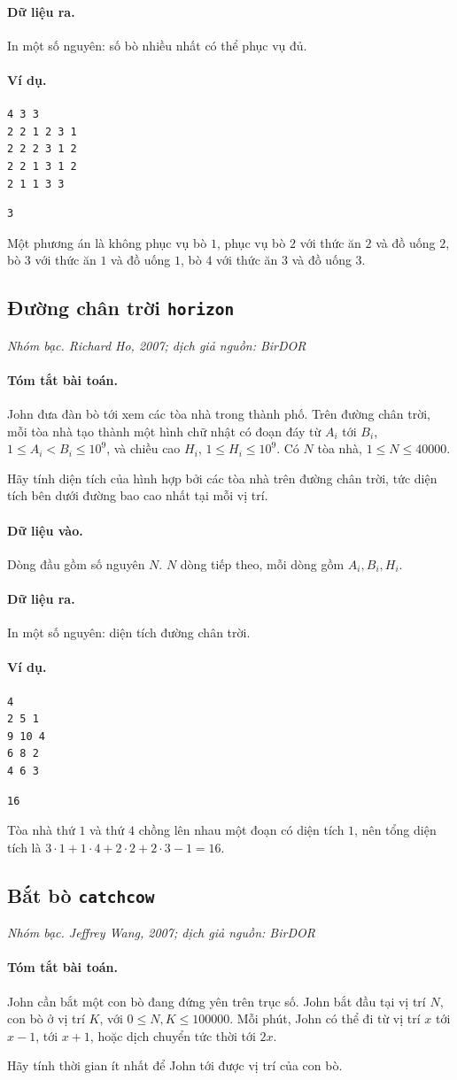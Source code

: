 \documentclass[11pt]{article}
\newcommand{\problem}[4]{%
  \subsection[#1 (#2)]{#1 \hfill {\normalsize\texttt{#2}}}%
  \noindent\textit{#3. #4}\par\smallskip
}
\newcommand{\iosec}[1]{\paragraph{#1}}
\begin{document}
\iosec{Dữ liệu ra.}
In một số nguyên: số bò nhiều nhất có thể phục vụ đủ.

\iosec{Ví dụ.}
\begin{verbatim}
4 3 3
2 2 1 2 3 1
2 2 2 3 1 2
2 2 1 3 1 2
2 1 1 3 3
\end{verbatim}

\begin{verbatim}
3
\end{verbatim}

Một phương án là không phục vụ bò \(1\), phục vụ bò \(2\) với thức ăn \(2\) và
đồ uống \(2\), bò \(3\) với thức ăn \(1\) và đồ uống \(1\), bò \(4\) với thức
ăn \(3\) và đồ uống \(3\).

\problem{Đường chân trời}{horizon}{Nhóm bạc}{Richard Ho, 2007; dịch giả nguồn: BirDOR}

\iosec{Tóm tắt bài toán.}
John đưa đàn bò tới xem các tòa nhà trong thành phố. Trên đường chân trời, mỗi
tòa nhà tạo thành một hình chữ nhật có đoạn đáy từ \(A_i\) tới \(B_i\),
\(1\le A_i<B_i\le 10^9\), và chiều cao \(H_i\),
\(1\le H_i\le 10^9\). Có \(N\) tòa nhà, \(1\le N\le 40000\).

Hãy tính diện tích của hình hợp bởi các tòa nhà trên đường chân trời, tức diện
tích bên dưới đường bao cao nhất tại mỗi vị trí.

\iosec{Dữ liệu vào.}
Dòng đầu gồm số nguyên \(N\). \(N\) dòng tiếp theo, mỗi dòng gồm
\(A_i,B_i,H_i\).

\iosec{Dữ liệu ra.}
In một số nguyên: diện tích đường chân trời.

\iosec{Ví dụ.}
\begin{verbatim}
4
2 5 1
9 10 4
6 8 2
4 6 3
\end{verbatim}

\begin{verbatim}
16
\end{verbatim}

Tòa nhà thứ \(1\) và thứ \(4\) chồng lên nhau một đoạn có diện tích \(1\), nên
tổng diện tích là \(3\cdot1+1\cdot4+2\cdot2+2\cdot3-1=16\).

\problem{Bắt bò}{catchcow}{Nhóm bạc}{Jeffrey Wang, 2007; dịch giả nguồn: BirDOR}

\iosec{Tóm tắt bài toán.}
John cần bắt một con bò đang đứng yên trên trục số. John bắt đầu tại vị trí
\(N\), con bò ở vị trí \(K\), với \(0\le N,K\le 100000\). Mỗi phút, John có
thể đi từ vị trí \(x\) tới \(x-1\), tới \(x+1\), hoặc dịch chuyển tức thời
tới \(2x\).

Hãy tính thời gian ít nhất để John tới được vị trí của con bò.
\end{document}
